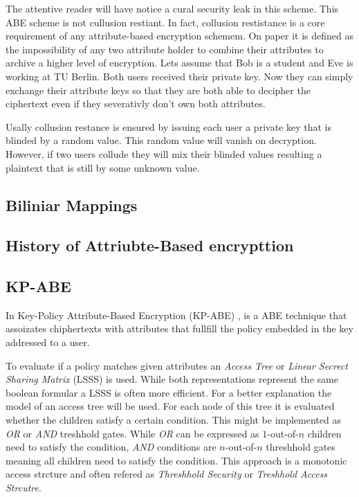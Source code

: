 The attentive reader will have notice a cural security leak in this scheme. This ABE scheme is not cullusion restiant. In fact, collusion restistance is a core requirement of any attribute-based encryption schemem. On paper it is defined as the impossibility of any two attribute holder to combine their attributes to archive a higher level of encryption. Lets assume that Bob is a student and Eve is working at TU Berlin. Both users received their private key. Now they can simply exchange their attribute keys so that they are both able to decipher the ciphertext even if they severativly don't own both attributes.  

Usally collusion restance is ensured by issuing each user a private key that is blinded by a random value. This random value will vanish on decryption. However, if two users collude they will mix their blinded values resulting a plaintext that is still by some unknown value. 

\subsection{Biliniar Mappings}

\subsection{History of Attriubte-Based encrypttion}

\subsection{KP-ABE}
In Key-Policy Attribute-Based Encryption (KP-ABE) \cite{goyal2006attribute}, is a ABE technique that assoizates chiphertexts with attributes that fullfill the policy embedded in the key addressed to a user. 

To evaluate if a policy matches given attributes an \textit{Access Tree} or \textit{Linear Secrect Sharing Matrix} (LSSS) is used. While both representations represent the same boolean formular a LSSS is often more efficient. For a better explanation the model of an access tree will be used. For each node of this tree it is evaluated whether the children satisfy a certain condition. This might be implemented as \textit{OR} or \textit{AND} treshhold gates. While \textit{OR} can be expressed as $1$-out-of-$n$ children need to satisfy the condition, \textit{AND} conditions are $n$-out-of-$n$ threshhold gates meaning all children need to satisfy the condition. This approach is a monotonic access strcture and often refered as \textit{Threshhold Security} or \textit{Treshhold Access Strcutre}. 

